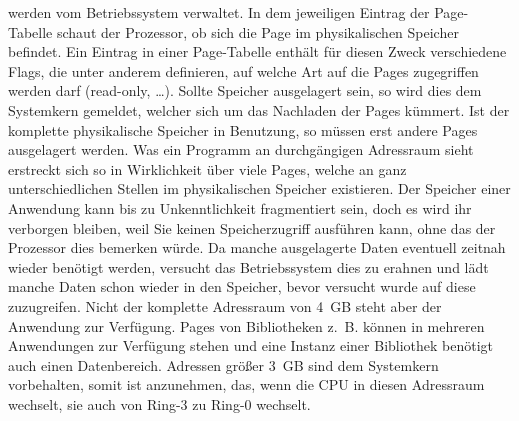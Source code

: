 \documentclass[12pt]{book}
\begin{document}
werden vom Betriebssystem verwaltet. In dem jeweiligen Eintrag der Page-Tabelle
schaut der Prozessor, ob sich die Page im physikalischen Speicher befindet. Ein
Eintrag in einer Page-Tabelle enthält für diesen Zweck verschiedene Flags, die
unter anderem definieren, auf welche Art auf die Pages zugegriffen werden darf
(read-only, …). Sollte Speicher ausgelagert sein, so wird dies dem Systemkern
gemeldet, welcher sich um das Nachladen der Pages kümmert. Ist der komplette
physikalische Speicher in Benutzung, so müssen erst andere Pages ausgelagert
werden. Was ein Programm an durchgängigen Adressraum sieht erstreckt sich so in
Wirklichkeit über viele Pages, welche an ganz unterschiedlichen Stellen im
physikalischen Speicher existieren. Der Speicher einer Anwendung kann bis zu
Unkenntlichkeit fragmentiert sein, doch es wird ihr verborgen bleiben, weil Sie
keinen Speicherzugriff ausführen kann, ohne das der Prozessor dies bemerken
würde. Da manche ausgelagerte Daten eventuell zeitnah wieder benötigt werden,
versucht das Betriebssystem dies zu erahnen und lädt manche Daten schon wieder
in den Speicher, bevor versucht wurde auf diese zuzugreifen. Nicht der komplette
Adressraum von 4 GB steht aber der Anwendung zur Verfügung. Pages von
Bibliotheken z. B. können in mehreren Anwendungen zur Verfügung stehen und eine
Instanz einer Bibliothek benötigt auch einen Datenbereich. Adressen größer 3 GB
sind dem Systemkern vorbehalten, somit ist anzunehmen, das, wenn die CPU in
diesen Adressraum wechselt, sie auch von Ring-3 zu Ring-0 wechselt.
\end{document}
